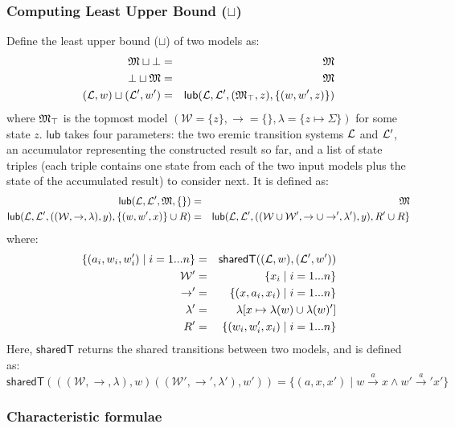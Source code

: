 \subsubsection{Computing Least Upper Bound ($\sqcup$)}
Define the least upper bound ($\sqcup$) of two models as:
\begin{eqnarray*}
\frak{M} \sqcup \bot & = & \frak{M} \\
\bot \sqcup \frak{M} & = & \frak{M} \\
(\mathcal{L},w) \sqcup (\mathcal{L}',w') & = & \mathsf{lub}(\mathcal{L}, \mathcal{L}', (\frak{M}_\top, z), \{(w, w', z)\})
\end{eqnarray*}
where $\frak{M}_\top$ is the topmost model $(\mathcal{W}=\{z\}, \rightarrow=\{\}, \lambda=\{z \mapsto \Sigma\})$ for some state $z$.
$\mathsf{lub}$ takes four parameters: the two eremic transition systems $\mathcal{L}$ and $\mathcal{L}'$, an accumulator representing the constructed result so far, and a list of state triples (each triple contains one state from each of the two input models plus the state of the accumulated result) to consider next.
It is defined as:
\begin{eqnarray*}
\mathsf{lub}(\mathcal{L}, \mathcal{L}', \frak{M}, \{\}) & = & \frak{M} \\
\mathsf{lub}(\mathcal{L}, \mathcal{L}', ((\mathcal{W}, \rightarrow, \lambda), y), \{(w,w',x)\} \cup R) & = & \mathsf{lub}(\mathcal{L}, \mathcal{L}', ((\mathcal{W} \cup \mathcal{W}', \rightarrow \cup \rightarrow', \lambda'), y), R' \cup R\}
\end{eqnarray*}
where:
\begin{eqnarray*}
\{(a_i, w_i, w'_i) \;|\; i = 1 ... n\} & = & \mathsf{sharedT}((\mathcal{L},w), (\mathcal{L}',w')) \\
\mathcal{W}' & = & \{x_i \;|\; i = 1 ... n\} \\
\rightarrow' & = & \{(x, a_i, x_i) \;|\; i = 1 ... n\} \\
\lambda' & = & \lambda [x \mapsto \lambda(w) \cup \lambda(w)'] \\
R' & = & \{(w_i, w'_i, x_i) \;|\; i = 1 ... n\}
\end{eqnarray*}
Here, $\mathsf{sharedT}$ returns the shared transitions between two models, and is defined as:
\[
\mathsf{sharedT}(((\mathcal{W}, \rightarrow, \lambda),w) ((\mathcal{W}', \rightarrow', \lambda'),w')) =  \{(a, x, x') \;|\; w \xrightarrow{a} x \land w' \xrightarrow{a}' x'\}
\]

\subsubsection{Characteristic formulae}

